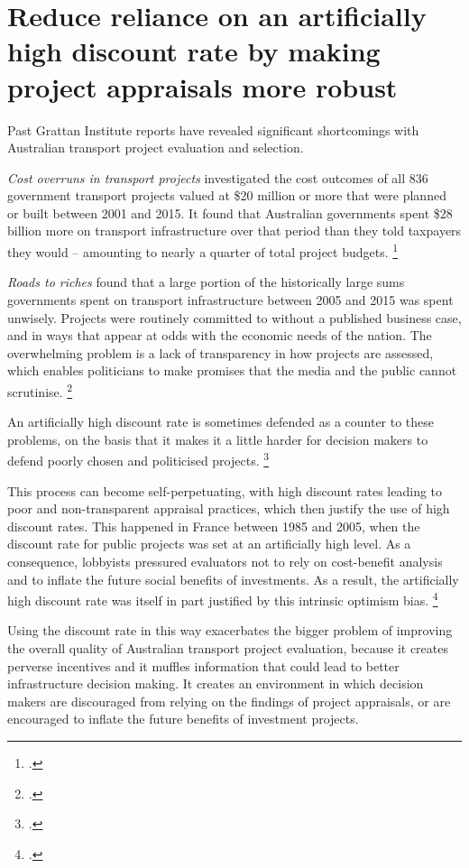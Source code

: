 \documentclass{grattan}
\begin{document}
\section{Reduce reliance on an artificially high discount rate by making project appraisals more robust}\label{subsec:tighten-project-appraisals}

Past Grattan Institute reports have revealed significant shortcomings with Australian transport project evaluation and selection. 

\emph{Cost overruns in transport projects} 
investigated the cost outcomes of all 836 government transport projects valued at \$20 million or more that were planned or built between 2001 and 2015. It found that Australian governments spent \$28 billion more on transport infrastructure over that period than they told taxpayers they would -- amounting to nearly a quarter of total project budgets.%
    \footcite{Terrill-etal-2016-Cost-overruns-in-transport-infrastructure}

\emph{Roads to riches} found that a large portion of the historically large sums governments spent on transport infrastructure between 2005 and 2015 was spent unwisely. Projects were routinely committed to without a published business case, and in ways that appear at odds with the economic needs of the nation. The overwhelming problem is a lack of transparency in how projects are assessed, which enables politicians to make promises that the media and the public cannot scrutinise.%
    \footcite{Terrill_2016}

An artificially high discount rate is sometimes defended as a counter to these problems, on the basis that it makes it a little harder for decision makers to defend poorly chosen and politicised projects.%
    \footcite{Terrill-Batrouney-oped-March2017-one-project-at-a-time}

This process can become self-perpetuating, with high discount rates leading to poor and non-transparent appraisal practices, which then justify the use of high discount rates. This happened in France between 1985 and 2005, when the discount rate for public projects was set at an artificially high level. As a consequence, lobbyists pressured evaluators not to rely on cost-benefit analysis and to inflate the future social benefits of investments. As a result, the artificially high discount rate was itself in part justified by this intrinsic optimism bias.%
    \footcite[][9]{Gollier-Pricing-the-planets-future} 

Using the discount rate in this way exacerbates the bigger problem of improving the overall quality of Australian transport project evaluation, because it creates perverse incentives and it muffles information that could lead to better infrastructure decision making. It creates an environment in which decision makers are discouraged from relying on the findings of project appraisals, or are encouraged to inflate the future benefits of investment projects. 
\end{document}
